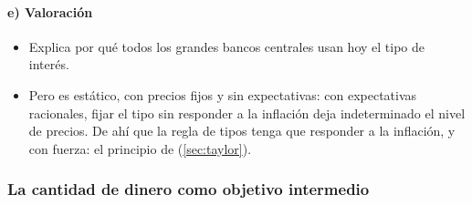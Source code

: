\documentclass[11pt]{article}
\begin{document}
\paragraph{e) Valoración}

\begin{itemize}
\item Explica por qué todos los grandes bancos centrales usan hoy el tipo de interés.
\item Pero es estático, con precios fijos y sin expectativas: con expectativas racionales, fijar el tipo sin responder a la inflación deja indeterminado el nivel de precios\nocite{SargentWallace1975Rational}. De ahí que la regla de tipos tenga que responder a la inflación, y con fuerza: el principio de  (\ref{sec:taylor}).
\end{itemize}

\subsubsection{La cantidad de dinero como objetivo intermedio}\label{sec:objetivo-dinero}
\end{document}
